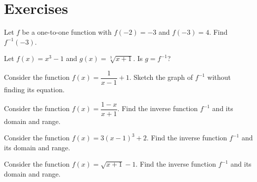\newpage

\section*{Exercises}
\begin{example}
  Let $f$ be a one-to-one function with \(f(-2)=-3\) and \(f(-3)=4\). Find $f^{-1}(-3)$.
\end{example}

\begin{exercise}
  Let \(f(x)=x^3-1\) and \(g(x)=\sqrt[3]{x+1}\). Is \(g=f^{-1}\)?
\end{exercise}

\begin{exercise}
  Consider the function $f(x)=\dfrac{1}{x-1}+1$. Sketch the graph of $f^{-1}$ without finding its equation.
\end{exercise}

\newpage

\begin{exercise}
  Consider the function $f(x)=\dfrac{1-x}{x+1}$. Find the inverse function $f^{-1}$ and its domain and range.
\end{exercise}

\begin{exercise}
  Consider the function $f(x)=3(x-1)^3+2$. Find the inverse function $f^{-1}$ and its domain and range.
\end{exercise}

\begin{exercise}
  Consider the function $f(x)=\sqrt{x+1}-1$. Find the inverse function $f^{-1}$ and its domain and range.
\end{exercise}
